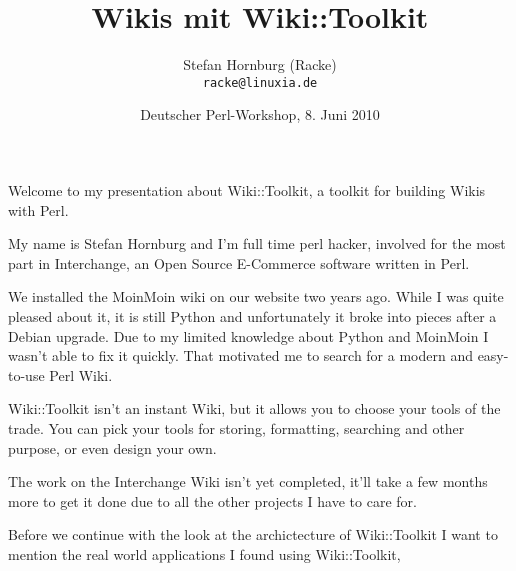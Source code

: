 
\usepackage[T1]{fontenc}
\usepackage{mathptmx}
\usepackage[scaled=.90]{helvet}
\usepackage{courier}

\usepackage{beamerthemesplit}
\usepackage{verbatim}
\usepackage{hyperref}
\usepackage{listings}
\lstset{language=Perl,basicstyle=\footnotesize,tabsize=3}


\title{Wikis mit Wiki::Toolkit}
\author[racke]{Stefan Hornburg (Racke)\\ \texttt{racke@linuxia.de}}
\date[GPW2010]{Deutscher Perl-Workshop, 8. Juni 2010}



\begin{frame}
  \titlepage
\end{frame}

\tableofcontents

Welcome to my presentation about Wiki::Toolkit, a toolkit for building
Wikis with Perl.

My name is Stefan Hornburg and I'm full time perl hacker, involved for
the most part in Interchange, an Open Source E-Commerce software 
written in Perl.

We installed the MoinMoin wiki on our website two years ago. While I was
quite pleased about it, it is still Python and unfortunately it broke 
into pieces after a Debian upgrade. Due to my limited knowledge about
Python and MoinMoin I wasn't able to fix it quickly.
That motivated me to search for a modern and easy-to-use Perl Wiki.

Wiki::Toolkit isn't an instant Wiki, but it allows you to choose
your tools of the trade. You can pick your tools for storing, formatting,
searching and other purpose, or even design your own.

The work on the Interchange Wiki isn't yet completed, it'll take a few
months more to get it done due to all the other projects I have to care
for.

Before we continue with the look at the archictecture of Wiki::Toolkit
I want to mention the real world applications I found using Wiki::Toolkit,

